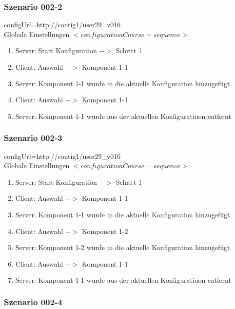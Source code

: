 \documentclass{article}
\begin{document}
\subsubsection{Szenario 002-2}

configUrl=http://contig1/user29\_v016\\

Globale Einstellungen $<configurationCourse=sequence>$

\begin{enumerate}
  \item Server: Start Konfiguration $->$ Schritt 1
  \item Client: Auswahl $->$ Komponent 1-1
  \item Server: Komponent 1-1 wurde in die aktuelle Konfiguration hinzugef\"ugt
  \item Client: Auswahl $->$ Komponent 1-1
  \item Server: Komponent 1-1 wurde aus der aktuellen Konfiguratiuon entfernt
\end{enumerate}

\subsubsection{Szenario 002-3}

configUrl=http://contig1/user29\_v016\\

Globale Einstellungen $<configurationCourse=sequence>$

\begin{enumerate}
  \item Server: Start Konfiguration $->$ Schritt 1
  \item Client: Auswahl $->$ Komponent 1-1
  \item Server: Komponent 1-1 wurde in die aktuelle Konfiguration hinzugef\"ugt
  \item Client: Auswahl $->$ Komponent 1-2
  \item Server: Komponent 1-2 wurde in die aktuelle Konfiguration hinzugef\"ugt
  \item Client: Auswahl $->$ Komponent 1-1
  \item Server: Komponent 1-1 wurde aus der aktuellen Konfiguratiuon entfernt
\end{enumerate}

\subsubsection{Szenario 002-4}
\end{document}
